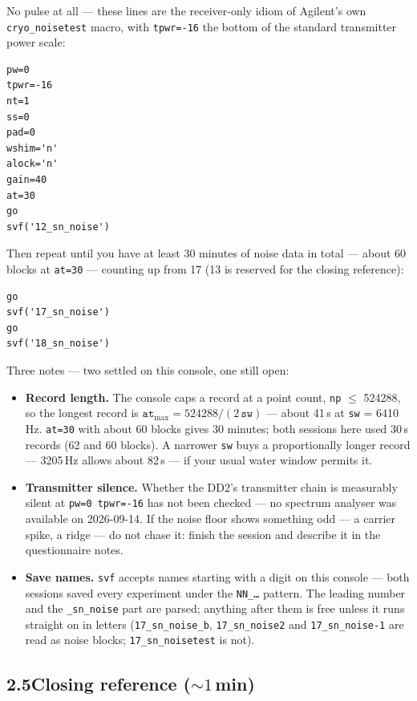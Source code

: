 \documentclass[11pt]{article}
\newcommand{\file}[1]{\texttt{#1}}
\begin{document}
No pulse at all --- these lines are the receiver-only idiom of
Agilent's own \texttt{cryo\_noisetest} macro, with \texttt{tpwr=-16}
the bottom of the standard transmitter power scale:

\begin{lstlisting}
pw=0
tpwr=-16
nt=1
ss=0
pad=0
wshim='n'
alock='n'
gain=40
at=30
go
svf('12_sn_noise')
\end{lstlisting}

Then repeat until you have at least 30 minutes of noise data in total
--- about 60 blocks at \texttt{at=30} --- counting up from 17 (13 is
reserved for the closing reference):

\begin{lstlisting}
go
svf('17_sn_noise')
go
svf('18_sn_noise')
\end{lstlisting}

Three notes --- two settled on this console, one still open:
\begin{itemize}
\item \textbf{Record length.} The console caps a record at a point
      count, \texttt{np} $\leq$ 524288, so the longest record is
      $\texttt{at}_{\max} = 524288/(2\,\texttt{sw})$ --- about 41\,s
      at \texttt{sw} = 6410\,Hz. \texttt{at=30} with about 60 blocks
      gives 30 minutes; both sessions here used 30\,s records (62 and
      60 blocks). A narrower \texttt{sw} buys a proportionally longer
      record --- 3205\,Hz allows about 82\,s --- if your usual water
      window permits it.
\item \textbf{Transmitter silence.} Whether the DD2's transmitter
      chain is measurably silent at \texttt{pw=0 tpwr=-16} has not
      been checked --- no spectrum analyser was available on
      2026-09-14. If the noise floor shows something odd --- a
      carrier spike, a ridge --- do not chase it: finish the session
      and describe it in the questionnaire notes.
\item \textbf{Save names.} \texttt{svf} accepts names starting with a
      digit on this console --- both sessions saved every experiment
      under the \file{NN\_\ldots} pattern. The leading number and the
      \texttt{\_sn\_noise} part are parsed; anything after them is
      free unless it runs straight on in letters
      (\texttt{17\_sn\_noise\_b}, \texttt{17\_sn\_noise2} and
      \texttt{17\_sn\_noise-1} are read as noise blocks;
      \texttt{17\_sn\_noisetest} is not).
\end{itemize}

\subsection*{2.5\quad Closing reference (${\sim}1$\,min)}
\end{document}
